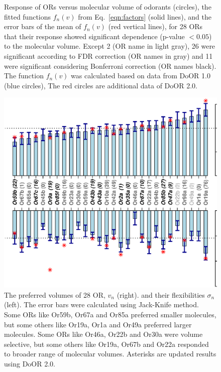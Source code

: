 \documentclass[fleqn,11pt]{wlscirep}
\newcommand{\numberofreceptors}{ 28 }
\newcommand{\bonferroni}{ 11 }
\newcommand{\fdr}{ 26 }
\newcommand{\nocorrection}{ 2 }
\begin{document}
\begin{figure}
	\caption{Response of ORs  versus molecular volume of odorants (circles),  
			the fitted functions $f_n(v)$ from Eq.~\ref{eqn:factors} (solid lines), 
			and the error bars of the mean of $f_n(v)$ (red vertical lines), 
			for \numberofreceptors ORs that their response showed significant dependence (p-value $<0.05$) to the molecular volume. 
			Except \nocorrection (OR name in light gray), \fdr were significant according to FDR correction (OR names in gray) and 
			\bonferroni were significant considering Bonferroni correction (OR names black).
			The function $f_n(v)$ was calculated based on data from DoOR 1.0 (blue circles), 
			The red circles are additional data of DoOR 2.0. 
		}
	\label{fig:vol-res}
\end{figure}

\begin{figure}
		\centering
		\includegraphics[height= 1  \textwidth , angle=-90]{mean-std-vol-}

	\caption{The preferred volumes of \numberofreceptors OR, $v_n$ (right). 
		and their flexibilities $\sigma_n$ (left). 
		The error bars were calculated using Jack-Knife method. 
		Some ORs like Or59b, Or67a and  Or85a preferred smaller molecules, 
		but some others like Or19a,  Or1a and  Or49a preferred larger molecules.
		Some ORs like Or46a,  Or22b and Or30a were volume  selective, 
		but some others like Or19a,  Or67b and  Or22a responded to broader range of molecular volumes.
		Asterisks are updated results using DoOR 2.0.
		}
		\label{fig:preferred_volume}
\end{figure}
\end{document}
